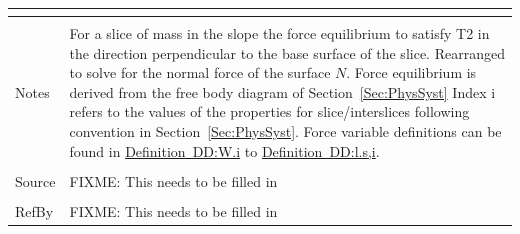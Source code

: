 \documentclass[12pt]{article}
\begin{document}
\begin{minipage}{\textwidth}
\begin{tabular}{p{} p{}}
\begin{symbDescription}
              \end{symbDescription}
\\ \midrule \\
Notes & For a slice of mass in the slope the force equilibrium to satisfy T2 in the direction perpendicular to the base surface of the slice. Rearranged to solve for the normal force of the surface $N$. Force equilibrium is derived from the free body diagram of Section~\ref{Sec:PhysSyst} Index i refers to the values of the properties for slice/interslices following convention in Section~\ref{Sec:PhysSyst}. Force variable definitions can be found in \hyperref[DD:W.i]{Definition~DD:W.i} to \hyperref[DD:l.s,i]{Definition~DD:l.s,i}.
\\ \midrule \\
Source & FIXME: This needs to be filled in
\\ \midrule \\
RefBy & FIXME: This needs to be filled in
\\ \bottomrule \end{tabular}
\end{minipage}\\
~\newline
\end{document}
